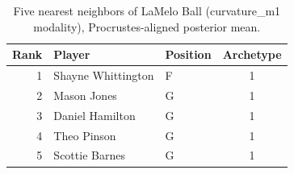 \begin{table}[htbp]
  \centering\small
  \begin{tabular}{rllc}
    \toprule
    Rank & Player & Position & Archetype \\
    \midrule
    1 & Shayne Whittington & F & 1 \\
    2 & Mason Jones & G & 1 \\
    3 & Daniel Hamilton & G & 1 \\
    4 & Theo Pinson & G & 1 \\
    5 & Scottie Barnes & G & 1 \\
    \bottomrule
  \end{tabular}
  \caption{Five nearest neighbors of LaMelo Ball (curvature_m1 modality), Procrustes-aligned posterior mean.}
  \label{tab:LaMelo_Ball_neighbors_curvature_m1}
\end{table}

